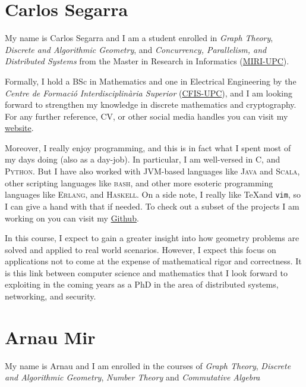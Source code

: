 \documentclass[11pt]{amsart}
\begin{document}
\section*{Carlos Segarra}

My name is Carlos Segarra and I am a student enrolled in \textit{Graph Theory}, \textit{Discrete and Algorithmic Geometry}, and \textit{Concurrency, Parallelism, and Distributed Systems} from the Master in Research in Informatics (\href{https://www.fib.upc.edu/en/studies/masters/master-innovation-and-research-informatics}{MIRI-UPC}).

Formally, I hold a BSc in Mathematics and one in Electrical Engineering by the \textit{Centre de Formaci\'o Interdisciplin\`aria Superior} (\href{https://cfis.upc.edu}{CFIS-UPC}), and I am looking forward to strengthen my knowledge in discrete mathematics and cryptography.
For any further reference, CV, or other social media handles you can visit my \href{https://carlossegarra.com}{website}.

Moreover, I really enjoy programming, and this is in fact what I spent most of my days doing (also as a day-job).
In particular, I am well-versed in \textsc{C}, and \textsc{Python}.
But I have also worked with JVM-based languages like \textsc{Java} and \textsc{Scala}, other scripting languages like \textsc{bash}, and other more esoteric programming languages like \textsc{Erlang}, and \textsc{Haskell}. 
On a side note, I really like \TeX and \texttt{vim}, so I can give a hand with that if needed.
To check out a subset of the projects I am working on you can visit my \href{https://github.com/csegarragonz}{Github}.

In this course, I expect to gain a greater insight into how geometry problems are solved and applied to real world scenarios.
However, I expect this focus on applications not to come at the expense of mathematical rigor and correctness.
It is this link between computer science and mathematics that I look forward to exploiting in the coming years as a PhD in the area of distributed systems, networking, and security.

\medskip


\section*{Arnau Mir}
My name is Arnau and I am enrolled in the courses of \textit{Graph Theory}, \textit{Discrete and Algorithmic Geometry}, \textit{Number Theory} and \textit{Commutative Algebra}
\end{document}
